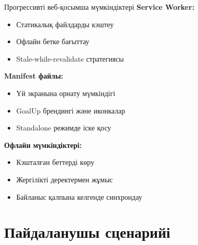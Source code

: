 \documentclass[12pt,a4paper]{article}
\begin{document}
\begin{featurebox}{Прогрессивті веб-қосымша мүмкіндіктері}
\textbf{Service Worker:}
\begin{itemize}
    \item Статикалық файлдарды кэштеу
    \item Офлайн бетке бағыттау
    \item Stale-while-revalidate стратегиясы
\end{itemize}

\textbf{Manifest файлы:}
\begin{itemize}
    \item Үй экранына орнату мүмкіндігі
    \item GoalUp брендингі және иконкалар
    \item Standalone режимде іске қосу
\end{itemize}

\textbf{Офлайн мүмкіндіктері:}
\begin{itemize}
    \item Кэшталған беттерді көру
    \item Жергілікті деректермен жұмыс
    \item Байланыс қалпына келгенде синхрондау
\end{itemize}
\end{featurebox}

\section{Пайдаланушы сценарийі}
\end{document}
